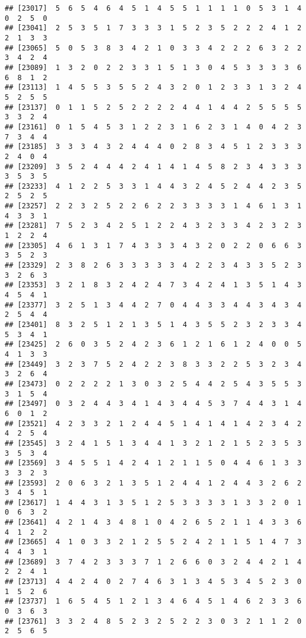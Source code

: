 \documentclass[
]{article}
\begin{document}
\begin{verbatim}
## [23017]  5  6  5  4  6  4  5  1  4  5  5  1  1  1  1  0  5  3  1  4  0  2  5  0
## [23041]  2  5  3  5  1  7  3  3  3  1  5  2  3  5  2  2  2  4  1  2  2  1  3  3
## [23065]  5  0  5  3  8  3  4  2  1  0  3  3  4  2  2  2  6  3  2  2  3  4  2  4
## [23089]  1  3  2  0  2  2  3  3  1  5  1  3  0  4  5  3  3  3  3  6  6  8  1  2
## [23113]  1  4  5  5  3  5  5  2  4  3  2  0  1  2  3  3  1  3  2  4  5  2  5  5
## [23137]  0  1  1  5  2  5  2  2  2  2  4  4  1  4  4  2  5  5  5  5  3  3  2  4
## [23161]  0  1  5  4  5  3  1  2  2  3  1  6  2  3  1  4  0  4  2  3  7  3  4  4
## [23185]  3  3  3  4  3  2  4  4  4  0  2  8  3  4  5  1  2  3  3  3  2  4  0  4
## [23209]  3  5  2  4  4  4  2  4  1  4  1  4  5  8  2  3  4  3  3  3  3  5  3  5
## [23233]  4  1  2  2  5  3  3  1  4  4  3  2  4  5  2  4  4  2  3  5  2  5  2  5
## [23257]  2  2  3  2  5  2  2  6  2  2  3  3  3  3  1  4  6  1  3  1  4  3  3  1
## [23281]  7  5  2  3  4  2  5  1  2  2  4  3  2  3  3  4  2  3  2  3  1  2  2  4
## [23305]  4  6  1  3  1  7  4  3  3  3  4  3  2  0  2  2  0  6  6  3  3  5  2  3
## [23329]  2  3  8  2  6  3  3  3  3  3  4  2  2  3  4  3  3  5  2  3  3  2  6  3
## [23353]  3  2  1  8  3  2  4  2  4  7  3  4  2  4  1  3  5  1  4  3  4  5  4  1
## [23377]  3  2  5  1  3  4  4  2  7  0  4  4  3  3  4  4  3  4  3  4  2  5  4  4
## [23401]  8  3  2  5  1  2  1  3  5  1  4  3  5  5  2  3  2  3  3  4  5  3  4  1
## [23425]  2  6  0  3  5  2  4  2  3  6  1  2  1  6  1  2  4  0  0  5  4  1  3  3
## [23449]  3  2  3  7  5  2  4  2  2  3  8  3  3  2  2  5  3  2  3  4  3  2  6  4
## [23473]  0  2  2  2  2  1  3  0  3  2  5  4  4  2  5  4  3  5  5  3  3  1  5  4
## [23497]  0  3  2  4  4  3  4  1  4  3  4  4  5  3  7  4  4  3  1  4  6  0  1  2
## [23521]  4  2  3  3  2  1  2  4  4  5  1  4  1  4  1  4  2  3  4  2  4  2  5  4
## [23545]  3  2  4  1  5  1  3  4  4  1  3  2  1  2  1  5  2  3  5  3  3  5  3  4
## [23569]  3  4  5  5  1  4  2  4  1  2  1  1  5  0  4  4  6  1  3  3  3  3  2  3
## [23593]  2  0  6  3  2  1  3  5  1  2  4  4  1  2  4  4  3  2  6  2  3  4  5  1
## [23617]  1  4  4  3  1  3  5  1  2  5  3  3  3  3  1  3  3  2  0  1  0  6  3  2
## [23641]  4  2  1  4  3  4  8  1  0  4  2  6  5  2  1  1  4  3  3  6  4  1  2  2
## [23665]  4  1  0  3  3  2  1  2  5  5  2  4  2  1  1  5  1  4  7  3  4  4  3  1
## [23689]  3  7  4  2  3  3  3  7  1  2  6  6  0  3  2  4  4  2  1  4  2  2  4  1
## [23713]  4  4  2  4  0  2  7  4  6  3  1  3  4  5  3  4  5  2  3  0  1  5  2  6
## [23737]  1  6  5  4  5  1  2  1  3  4  6  4  5  1  4  6  2  3  3  6  0  3  6  3
## [23761]  3  3  2  4  8  5  2  3  2  5  2  2  3  0  3  2  1  1  2  0  2  5  6  5

\end{verbatim}
\end{document}
